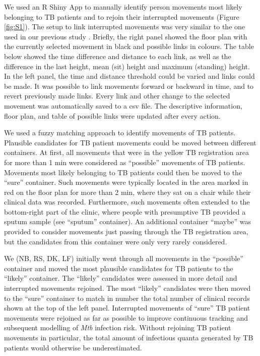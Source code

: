 \documentclass[11pt]{article}
\begin{document}
We used an R Shiny App to manually identify person movements most likely belonging to TB patients and to rejoin their interrupted movements (Figure \ref{fig:S1}). The setup to link interrupted movements was very similar to the one used in our previous study \cite{banholzer2025PLOSComputBiol}. Briefly, the right panel showed the floor plan with the currently selected movement in black and possible links in colours. The table below showed the time difference and distance to each link, as well as the difference in the last height, mean (sit) height and maximum (standing) height. In the left panel, the time and distance threshold could be varied and links could be made. It was possible to link movements forward or backward in time, and to revert previously made links. Every link and other change to the selected movement was automatically saved to a csv file. The descriptive information, floor plan, and table of possible links were updated after every action.

We used a fuzzy matching approach to identify movements of TB patients. Plausible candidates for TB patient movements could be moved between different containers. At first, all movements that were in the yellow TB registration area for more than 1 min were considered as ``possible'' movements of TB patients. Movements most likely belonging to TB patients could then be moved to the ``sure'' container. Such movements were typically located in the area marked in red on the floor plan for more than 2 min, where they sat on a chair while their clinical data was recorded. Furthermore, such movements often extended to the bottom-right part of the clinic, where people with presumptive TB provided a sputum sample (see ``sputum'' container). An additional container ``maybe'' was provided to consider movements just passing through the TB registration area, but the candidates from this container were only very rarely considered.

We (NB, RS, DK, LF) initially went through all movements in the ``possible'' container and moved the most plausible candidates for TB patients to the ``likely'' container. The ``likely'' candidates were assessed in more detail and interrupted movements rejoined. The most ``likely'' candidates were then moved to the ``sure'' container to match in number the total number of clinical records shown at the top of the left panel. Interrupted movements of ``sure'' TB patient movements were rejoined as far as possible to improve continuous tracking and subsequent modelling of \emph{Mtb} infection risk. Without rejoining TB patient movements in particular, the total amount of infectious quanta generated by TB patients would otherwise be underestimated.
\end{document}
